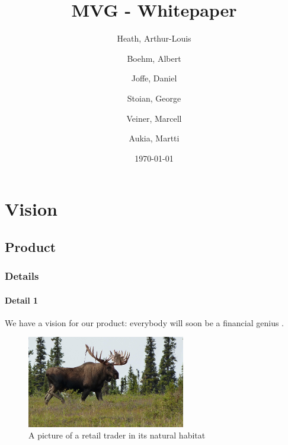 \documentclass{article}
\begin{document}
    \title{MVG - Whitepaper}
    \author{
      Heath, Arthur-Louis
      \and
      Boehm, Albert
      \and
      Joffe, Daniel
      \and
      Stoian, George
      \and
      Veiner, Marcell
      \and
      Aukia, Martti
    }
    \date{\today}
    \maketitle
    
    \tableofcontents
    
    

    \section{Vision}
    \subsection{Product}
    \subsubsection{Details}
    \paragraph{Detail 1}
    We have a vision for our product: everybody will soon be a financial genius \cite{genius_2000}.
    \begin{figure}[H]
        \includegraphics[height=4cm]{moose}
        \centering
        \caption{A picture of a retail trader in its natural habitat}
    \end{figure}

{}

\end{document}
